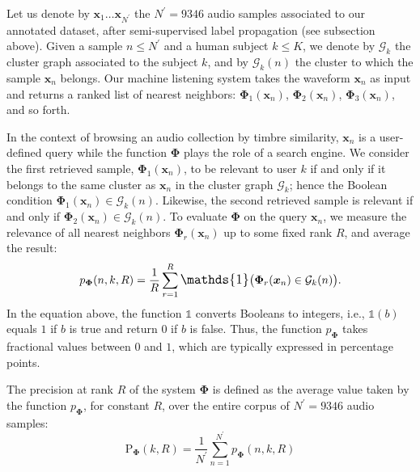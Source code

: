 \documentclass{bmcart}
\begin{document}
Let us denote by $\boldsymbol{x}_1 \ldots \boldsymbol{x}_{{N}^{\prime}}$ the $N^{\prime}=9346$ audio samples associated to our annotated dataset, after semi-supervised label propagation (see subsection above).
Given a sample $n\leq N^{\prime}$ and a human subject $k\leq K$, we denote by $\mathcal{G}_k$ the cluster graph associated to the subject $k$, and by $\mathcal{G}_k (n)$ the cluster to which the sample $\boldsymbol{x}_{n}$ belongs.
Our machine listening system takes the waveform $\boldsymbol{x}_{n}$ as input and returns a ranked list of nearest neighbors: $\mathbf{\Phi}_1 (\boldsymbol{x}_n)$, $\mathbf{\Phi}_2 (\boldsymbol{x}_n)$, $\mathbf{\Phi}_3 (\boldsymbol{x}_n)$, and so forth.

In the context of browsing an audio collection by timbre similarity, $\boldsymbol{x}_n$ is a user-defined query while the function $\mathbf{\Phi}$ plays the role of a search engine.
We consider the first retrieved sample, $\mathbf{\Phi}_1 (\boldsymbol{x}_n)$, to be relevant to user $k$ if and only if it belongs to the same cluster as $\boldsymbol{x}_n$ in the cluster graph $\mathcal{G}_k$; hence the Boolean condition $\mathbf{\Phi}_{1}(\boldsymbol{x}_{n}) \in \mathcal{G}_k (n)$.
Likewise, the second retrieved sample is relevant if and only if $\mathbf{\Phi}_{2}(\boldsymbol{x}_{n}) \in \mathcal{G}_k (n)$.
To evaluate $\mathbf{\Phi}$ on the query $\boldsymbol{x}_n$, we measure the relevance of all nearest neighbors $\mathbf{\Phi}_r (\boldsymbol{x}_n)$ up to some fixed rank $R$, and average the result:
\begin{equation}
p_{\mathbf{\Phi}}(n, k, R) =
    \dfrac{1}{R}
    \sum_{r=1}^{R}
    \mathlarger{\mathds{1}}
    \big(
        \mathbf{\Phi}_r(\boldsymbol{x}_n)
        \in
        \mathcal{G}_k (n)
    \big).
\end{equation}
In the equation above, the function $\mathds{1}$ converts Booleans to integers, i.e., $\mathds{1}(b)$ equals $1$ if $b$ is true and return $0$ if $b$ is false.
Thus, the function $p_{\mathbf{\Phi}}$ takes fractional values between $0$ and $1$, which are typically expressed in percentage points.

The precision at rank $R$ of the system $\mathbf{\Phi}$ is defined as the average value taken by the function $p_{\mathbf{\Phi}}$, for constant $R$, over the entire corpus of $N^{\prime}=9346$ audio samples:
\begin{equation}
\mathrm{P}_{\mathbf{\Phi}}(k, R) =
\dfrac{1}{N^{\prime}}
\sum_{n=1}^{N^{\prime}}
p_{\mathbf{\Phi}}(n, k, R)
\end{equation}
\end{document}
